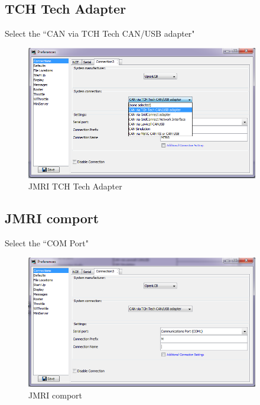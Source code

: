 \documentclass[11pt]{book}
\begin{document}
\subsection{TCH Tech Adapter}
Select the ``CAN via TCH Tech CAN/USB adapter"
\begin{figure}[htbp]
\begin{center}
\includegraphics[width=4in]{images/jmri_tch_adapter.png}
\caption{JMRI TCH Tech Adapter}
\end{center}
\end{figure}

\subsection{JMRI comport}
Select the ``COM Port"
\begin{figure}[htbp]
\begin{center}
\includegraphics[width=4in]{images/jmri_comport.png}
\caption{JMRI comport}
\end{center}
\end{figure}
\end{document}
